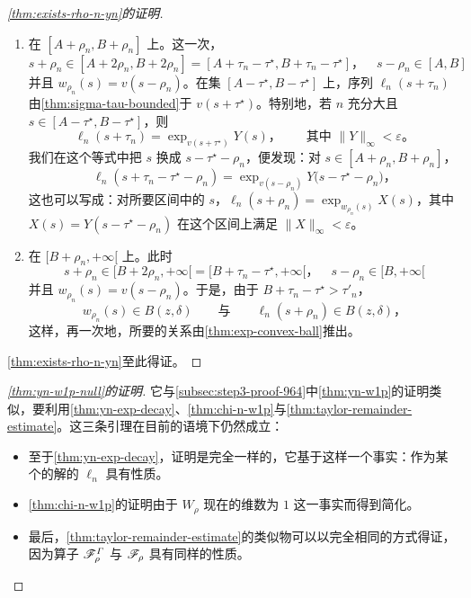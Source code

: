 \begin{proof}[\cref{thm:exists-rho-n-yn}的证明]
\begin{enumerate}[label=(\arabic*)]
\[
s+\rho_{n}\in[B,A+2\rho_{n}]=[B,A+\tau_{n}-\tau^{\star}]
\qquad\text{与}\qquad
s-\rho_{n}\in[B-2\rho_{n},A]\text{，}
\]
这蕴含
\[
u(s+\rho_{n})\in B(y,\delta)
\qquad\text{与}\qquad
v(s-\rho_{n})\in B(y,\delta)\text{。}
\]
并且，由于 $B>\sigma_{n}$ 与 $A+\tau_{n}-\tau^{\star}<\tau_{n}$，
\[
\ell_{n}(s+\rho_{n})\in B(y,\delta)\text{。}
\]
所要的关系随即由\cref{thm:exp-convex-ball}推出。
\item 在 $[A+\rho_{n},B+\rho_{n}]$ 上。这一次，
\[
s+\rho_{n}\in[A+2\rho_{n},B+2\rho_{n}]=[A+\tau_{n}-\tau^{\star},B+\tau_{n}-\tau^{\star}]\text{，}\quad
s-\rho_{n}\in[A,B]
\]
并且 $w_{\rho_{n}}(s)=v(s-\rho_{n})$。在\trCompact{}集 $[A-\tau^{\star},B-\tau^{\star}]$ 上，序列 $\ell_{n}(s+\tau_{n})$ 由\cref{thm:sigma-tau-bounded}\trUniformConvergence{}于 $v(s+\tau^{\star})$。特别地，若 $n$ 充分大且 $s\in[A-\tau^{\star},B-\tau^{\star}]$，则
\[
\ell_{n}(s+\tau_{n})=\exp_{v(s+\tau^{\star})}Y(s)\text{，}\qquad\text{其中 } \bigl\|Y\bigr\|_{\infty}<\varepsilon\text{。}
\]
我们在这个等式中把 $s$ 换成 $s-\tau^{\star}-\rho_{n}$，便发现：对 $s\in[A+\rho_{n},B+\rho_{n}]$，
\[
\ell_{n}(s+\tau_{n}-\tau^{\star}-\rho_{n})=\exp_{v(s-\rho_{n})}Y\bigl(s-\tau^{\star}-\rho_{n}\bigr)\text{，}
\]
这也可以写成：对所要区间中的 $s$，$\ell_{n}(s+\rho_{n})=\exp_{w_{\rho_{n}}(s)}X(s)$，其中 $X(s)=Y(s-\tau^{\star}-\rho_{n})$ 在这个区间上满足 $\bigl\|X\bigr\|_{\infty}<\varepsilon$。
\item 在 $[B+\rho_{n},+\infty[$ 上。此时
\[
s+\rho_{n}\in[B+2\rho_{n},+\infty[=[B+\tau_{n}-\tau^{\star},+\infty[\text{，}\quad
s-\rho_{n}\in[B,+\infty[
\]
并且 $w_{\rho_{n}}(s)=v(s-\rho_{n})$。于是，由于 $B+\tau_{n}-\tau^{\star}>\tau'_{n}$，
\[
w_{\rho_{n}}(s)\in B(z,\delta)
\qquad\text{与}\qquad
\ell_{n}(s+\rho_{n})\in B(z,\delta)\text{，}
\]
这样，再一次地，所要的关系由\cref{thm:exp-convex-ball}推出。
\end{enumerate}

\cref{thm:exists-rho-n-yn}至此得证。
\end{proof}

\begin{proof}[\cref{thm:yn-w1p-null}的证明]
它与\cref{subsec:step3-proof-964}中\cref{thm:yn-w1p}的证明类似，要利用\cref{thm:yn-exp-decay}、\cref{thm:chi-n-w1p}与\cref{thm:taylor-remainder-estimate}。这三条引理在目前的语境下仍然成立：
\begin{itemize}
\item 至于\cref{thm:yn-exp-decay}，证明是完全一样的，它基于这样一个事实：作为某个\trFloerEquation{}的解的 $\ell_{n}$ 具有\trExponentialDecay{}性质。
\item \cref{thm:chi-n-w1p}的证明由于 $W_{\rho}$ 现在的维数为 $1$ 这一事实而得到简化。
\item 最后，\cref{thm:taylor-remainder-estimate}的类似物可以以完全相同的方式得证，因为\trFloer{}算子 $\mathscr{F}^{\varGamma}_{\rho}$ 与 $\mathscr{F}_{\rho}$ 具有同样的性质。
\end{itemize}
\end{proof}

